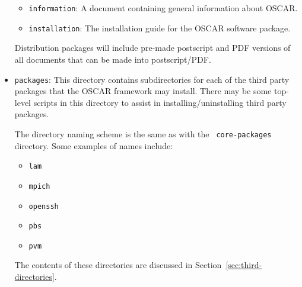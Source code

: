 \begin{itemize}
\begin{itemize}
  \item {\tt information}: A document containing general information
    about OSCAR.
    
  \item {\tt installation}: The installation guide for the OSCAR
    software package.
  \end{itemize}
  
  Distribution packages will include pre-made postscript and PDF
  versions of all documents that can be made into postscript/PDF.

\item {\tt packages}: This directory contains subdirectories for each
  of the third party packages that the OSCAR framework may install.
  There may be some top-level scripts in this directory to assist in
  installing/uninstalling third party packages.

  The directory naming scheme is the same as with the {\tt
    core-packages} directory.  Some examples of names include:

  \begin{itemize}
  \item {\tt lam}
  \item {\tt mpich}
  \item {\tt openssh}
  \item {\tt pbs}
  \item {\tt pvm}
  \end{itemize}
  
  The contents of these directories are discussed in
  Section~\ref{sec:third-directories}.

\end{itemize}


